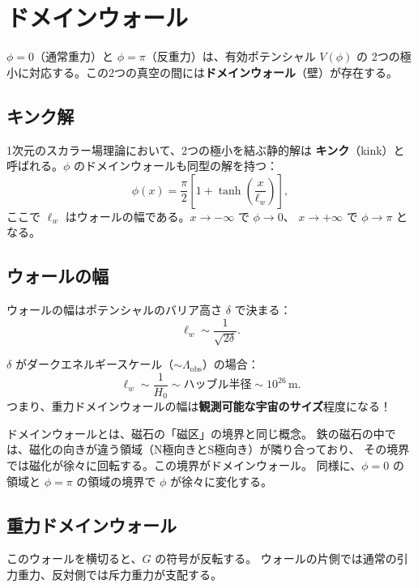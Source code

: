 \section{ドメインウォール}
\label{sec:13.1}

$\phi = 0$（通常重力）と $\phi = \pi$（反重力）は、有効ポテンシャル $V(\phi)$ の
2つの極小に対応する。この2つの真空の間には\textbf{ドメインウォール}（壁）が存在する。

\subsection{キンク解}

1次元のスカラー場理論において、2つの極小を結ぶ静的解は
\textbf{キンク}（kink）と呼ばれる。$\phi$ のドメインウォールも同型の解を持つ：
\[
  \phi(x) = \frac{\pi}{2}\left[1 + \tanh\left(\frac{x}{\ell_w}\right)\right],
\]
ここで $\ell_w$ はウォールの幅である。$x \to -\infty$ で $\phi \to 0$、
$x \to +\infty$ で $\phi \to \pi$ となる。

\subsection{ウォールの幅}

ウォールの幅はポテンシャルのバリア高さ $\delta$ で決まる：
\[
  \ell_w \sim \frac{1}{\sqrt{2\delta}}.
\]

\begin{keyresult}[ドメインウォールの幅]
$\delta$ がダークエネルギースケール（$\sim \Lambda_{\mathrm{obs}}$）の場合：
\[
  \ell_w \sim \frac{1}{H_0} \sim \text{ハッブル半径} \sim 10^{26}\,\text{m}.
\]
つまり、重力ドメインウォールの幅は\textbf{観測可能な宇宙のサイズ}程度になる！
\end{keyresult}

\begin{hsbox}
ドメインウォールとは、磁石の「磁区」の境界と同じ概念。
鉄の磁石の中では、磁化の向きが違う領域（N極向きとS極向き）が隣り合っており、
その境界では磁化が徐々に回転する。この境界がドメインウォール。
同様に、$\phi = 0$ の領域と $\phi = \pi$ の領域の境界で $\phi$ が徐々に変化する。
\end{hsbox}

\subsection{重力ドメインウォール}

このウォールを横切ると、$G$ の符号が反転する。
ウォールの片側では通常の引力重力、反対側では斥力重力が支配する。

